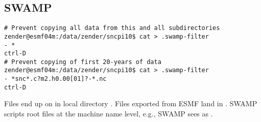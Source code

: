 \documentclass[12pt,twoside]{article}
\begin{document}
\subsection{SWAMP}\label{sxn:swamp}
\begin{verbatim}
# Prevent copying all data from this and all subdirectories
zender@esmf04m:/data/zender/sncpi10$ cat > .swamp-filter
- *
ctrl-D
# Prevent copying of first 20-years of data
zender@esmf04m:/data/zender/sncpi10$ cat > .swamp-filter
- *snc*.c?m2.h0.00[01]?-*.nc
ctrl-D
\end{verbatim}
Files end up on  in local directory
.
Files exported from ESMF land in 
.
SWAMP scripts root files at the machine name level, e.g.,
SWAMP sees  as
.
\end{document}
